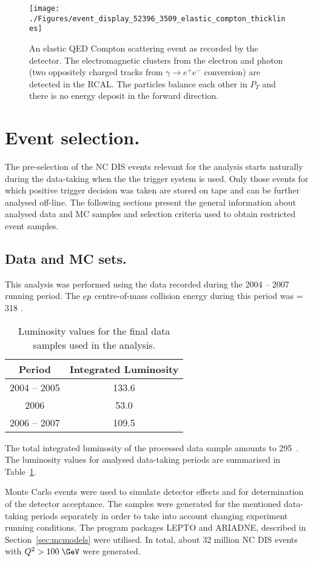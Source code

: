 \begin{figure}[htbp]
	\centering
	\texttt{[image: ./Figures/event\_display\_52396\_3509\_elastic\_compton\_thicklines]} 
	\caption{An elastic QED Compton scattering event as recorded by the \zeus detector. The electromagnetic clusters from the electron and photon (two oppositely charged tracks from $\gamma \rightarrow e^+e^-$ conversion) are detected in the RCAL. The particles balance each other in $P_T$ and there is no energy deposit in the forward direction.}
	\label{fig:qedceventdisplay}
\end{figure}

\section{Event selection.}
The pre-selection of the NC DIS events relevant for the analysis starts naturally during the data-taking when the the \zeus trigger system is used. Only those events for which positive trigger decision was taken are stored on tape and can be further analysed off-line. The following sections present the general information about analysed data and MC samples and selection criteria used to obtain restricted event samples.

\subsection{Data and MC sets.}
This analysis was performed using the data recorded during the 2004 -- 2007 running period. The $\mbox{$e p$}$ centre-of-mass collision energy during this period was \sqs = 318 \GeV.
\begin{table}
	\centering
		\begin{tabular}[h]{c|c}
		  \hline
			Period & Integrated Luminosity \\
			\hline \hline
			2004 -- 2005  & 133.6 \invpb  \\
			2006             & 53.0 \invpb   \\
			2006 -- 2007  & 109.5 \invpb \\
			\hline
		\end{tabular}
	\caption{Luminosity values for the final data samples used in the analysis.}
	\label{tab:selecteddatasample}
\end{table}
The total integrated luminosity of the processed data sample amounts to 295~\invpb. The luminosity values for analysed data-taking periods are summarised in Table~\ref{tab:selecteddatasample}.

Monte Carlo events were used to simulate detector effects and for determination of the detector acceptance. The samples were generated for the mentioned data-taking periods separately in order to take into account changing experiment running conditions. The program packages LEPTO and ARIADNE, described in Section~\ref{sec:mcmodels} were utilised. In total, about 32 million NC DIS events with $\qsq > 100\;\GeV$ were generated.

